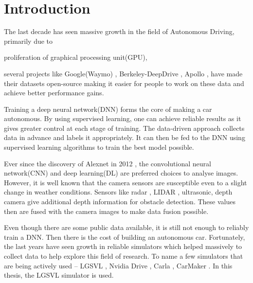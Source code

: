 \chapter{Introduction}

The last decade has seen massive growth in the field of Autonomous
Driving, primarily due to
\begin{enumerate*}[label= \alph*)]
    \item proliferation of graphical processing unit(GPU),

    \item several projects like Google(Waymo) \cite{Waymo},
        Berkeley-DeepDrive \cite{Berkeley-DeepDrive},
        Apollo \cite{Apollo}, have made their datasets open-source making it
        easier for people to work on these data and achieve better performance gains.
\end{enumerate*}



Training a deep neural network(DNN) forms the core of making a car autonomous.
By using supervised learning, one can achieve reliable results as it gives greater control
at each stage of training. The data-driven approach collects data in advance and labels it
appropriately. It can then be fed to the DNN using supervised
learning algorithms to train the best model possible.

Ever since the discovery of Alexnet in 2012 \cite{Alexnet2012}, the convolutional neural network(CNN) and
deep learning(DL) are preferred choices to analyse images.  However, it is well known that the camera sensors are susceptible even to a slight change in weather conditions.
Sensors like radar \cite{Radar}, LIDAR \cite{LIDAR}, ultrasonic\cite{ultrasonic}, depth camera
give additional depth information for obstacle detection. These values then are fused with the camera images to make
data fusion possible.

Even though there are some public data available, it is still not enough to reliably
train a DNN. Then there is  the cost of building an autonomous car. Fortunately, the last
years have seen growth in reliable simulators which
helped massively to collect data to help explore this field of research.
To name a few simulators that are being actively used -- LGSVL \cite{rong2020lgsvl}, Nvidia Drive
\cite{NvidiaSimulator}, Carla \cite{CarlaSimulator}, CarMaker \cite{CarMaker}.
In this thesis, the LGSVL simulator is used.

